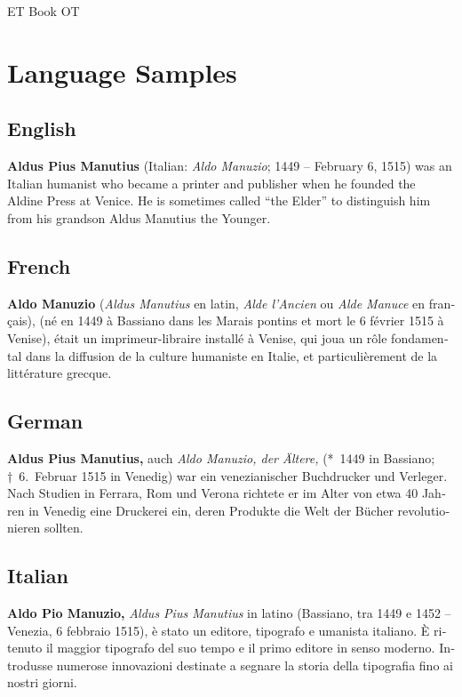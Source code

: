\documentclass{scrartcl}
\begin{document}
{\pagestyle{empty}
\begin{center}
  \vspace*{5cm}
  {\Huge ET Book OT}
\end{center}\clearpage
}

\section{Language Samples}

\begin{multicols}{2}

\subsection{English}
\noindent\textbf{Aldus Pius Manutius} (Italian: \textit{Aldo Manuzio}; 1449 – February 6, 1515) was an Italian humanist who became a printer and publisher when he founded the Aldine Press at Venice. He is sometimes called “the Elder” to distinguish him from his grandson Aldus Manutius the Younger.

\subsection{French}
\begin{french}
\noindent\textbf{Aldo Manuzio} (\textit{Aldus Manutius} en latin, \textit{Alde l’Ancien} ou \textit{Alde Manuce} en français), (né en 1449 à Bassiano dans les Marais pontins et mort le 6 février 1515 à Venise), était un imprimeur-libraire installé à Venise, qui joua un rôle fondamental dans la diffusion de la culture humaniste en Italie, et particulièrement de la littérature grecque.
\end{french}

\subsection{German}
\begin{german}
\noindent\textbf{Aldus Pius Manutius,} auch \textit{Aldo Manuzio, der Ältere,} (*~1449 in Bassiano; †~6.~Februar 1515 in Venedig) war ein venezianischer Buchdrucker und Verleger.  Nach Studien in Ferrara, Rom und Verona richtete er im Alter von etwa 40 Jahren in Venedig eine Druckerei ein, deren Produkte die Welt der Bücher revolutionieren sollten.
\end{german}

\subsection{Italian}
\begin{italian}
\noindent\textbf{Aldo Pio Manuzio,} \textit{Aldus Pius Manutius} in latino (Bassiano, tra 1449 e 1452 – Venezia, 6 febbraio 1515), è stato un editore, tipografo e umanista italiano. È ritenuto il maggior tipografo del suo tempo e il primo editore in senso moderno. Introdusse numerose innovazioni destinate a segnare la storia della tipografia fino ai nostri giorni.
\end{italian}


\end{multicols}
\end{document}
